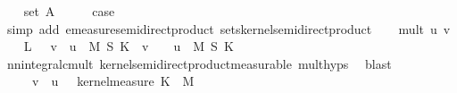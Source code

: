 \begin{isabellebody}
\isanewline
\ \ \isamarkupfalse%
\ {\isacharparenleft}{\kern0pt}set\ A{\isacharparenright}{\kern0pt}\isanewline
\ \ \isamarkupfalse%
\ \isamarkupfalse%
\ {\isacharquery}{\kern0pt}case\isanewline
\ \ \ \ \isamarkupfalse%
\ {\isacharparenleft}{\kern0pt}simp\ add{\isacharcolon}{\kern0pt}\ emeasure{\isacharunderscore}{\kern0pt}semidirect{\isacharunderscore}{\kern0pt}product\ sets{\isacharunderscore}{\kern0pt}kernel{\isacharunderscore}{\kern0pt}semidirect{\isacharunderscore}{\kern0pt}product{\isacharparenright}{\kern0pt}\isanewline
{}\isamarkupfalse%
\isanewline
\ \ \isamarkupfalse%
\ {\isacharparenleft}{\kern0pt}mult\ u\ v{\isacharparenright}{\kern0pt}\isanewline
\ \ \isamarkupfalse%
\ L{\isacharcolon}{\kern0pt}\ {\isachardoublequoteopen}{\isacharparenleft}{\kern0pt}{\isasymintegral}\isactrlsup {\isacharplus}{\kern0pt}\ {\isasymomega}{\isachardot}{\kern0pt}\ v\ {\isacharasterisk}{\kern0pt}\ u\ {\isasymomega}\ {\isasympartial}{\isacharparenleft}{\kern0pt}M\ {\isasymOtimes}\isactrlsub S\ K{\isacharparenright}{\kern0pt}{\isacharparenright}{\kern0pt}\ {\isacharequal}{\kern0pt}\ v\ {\isacharasterisk}{\kern0pt}\ {\isacharparenleft}{\kern0pt}{\isasymintegral}\isactrlsup {\isacharplus}{\kern0pt}\ {\isasymomega}{\isachardot}{\kern0pt}\ u\ {\isasymomega}\ {\isasympartial}{\isacharparenleft}{\kern0pt}M\ {\isasymOtimes}\isactrlsub S\ K{\isacharparenright}{\kern0pt}{\isacharparenright}{\kern0pt}{\isachardoublequoteclose}\isanewline
\ \ \ \ \isamarkupfalse%
\ nn{\isacharunderscore}{\kern0pt}integral{\isacharunderscore}{\kern0pt}cmult\ kernel{\isacharunderscore}{\kern0pt}semidirect{\isacharunderscore}{\kern0pt}product{\isacharunderscore}{\kern0pt}measurable\ mult{\isachardot}{\kern0pt}hyps{\isacharparenleft}{\kern0pt}{}{\isacharparenright}{\kern0pt}\ \isamarkupfalse%
\ blast\isanewline
\ \ \isamarkupfalse%
\ {\isachardoublequoteopen}{\isacharparenleft}{\kern0pt}{\isasymintegral}\isactrlsup {\isacharplus}{\kern0pt}\ {\isasymomega}\ {\isasymintegral}\isactrlsup {\isacharplus}{\kern0pt}\ {\isasymomega}\ v\ {\isacharasterisk}{\kern0pt}\ u\ {\isacharparenleft}{\kern0pt}{\isasymomega}\ {\isasymomega}\ {\isasympartial}kernel{\isacharunderscore}{\kern0pt}measure\ K\ {\isasymomega}\ {\isasympartial}M{\isacharparenright}{\kern0pt}\ {\isacharequal}{\kern0pt}\isanewline

\end{isabellebody}
